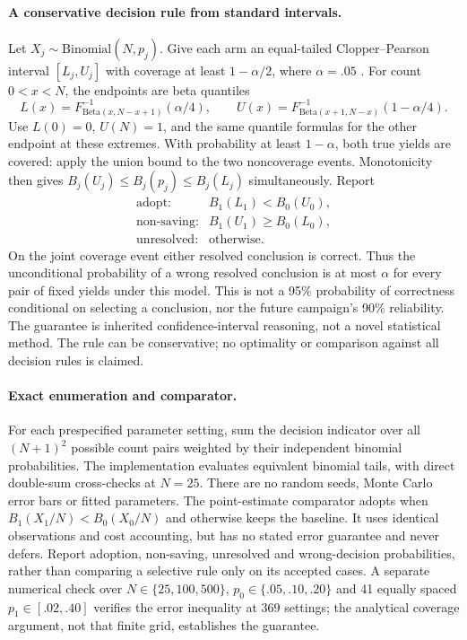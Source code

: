 \paragraph{A conservative decision rule from standard intervals.}
Let $X_j\sim\mathrm{Binomial}(N,p_j)$. Give each arm an equal-tailed Clopper--Pearson interval $[L_j,U_j]$ with coverage at least $1-\alpha/2$, where $\alpha=.05$ \citep{clopper1934}. For count $0<x<N$, the endpoints are beta quantiles
\[
 L(x)=F^{-1}_{\mathrm{Beta}(x,N-x+1)}(\alpha/4),\qquad
 U(x)=F^{-1}_{\mathrm{Beta}(x+1,N-x)}(1-\alpha/4).
\]
Use $L(0)=0$, $U(N)=1$, and the same quantile formulas for the other endpoint at these extremes. With probability at least $1-\alpha$, both true yields are covered: apply the union bound to the two noncoverage events. Monotonicity then gives $B_j(U_j)\le B_j(p_j)\le B_j(L_j)$ simultaneously. Report
\[
 \begin{array}{ll}
 \text{adopt:} & B_1(L_1)<B_0(U_0),\\
 \text{non-saving:} & B_1(U_1)\ge B_0(L_0),\\
 \text{unresolved:} & \text{otherwise}.
 \end{array}
\]
On the joint coverage event either resolved conclusion is correct. Thus the unconditional probability of a wrong resolved conclusion is at most $\alpha$ for every pair of fixed yields under this model. This is not a 95\% probability of correctness conditional on selecting a conclusion, nor the future campaign's 90\% reliability. The guarantee is inherited confidence-interval reasoning, not a novel statistical method. The rule can be conservative; no optimality or comparison against all decision rules is claimed.

\paragraph{Exact enumeration and comparator.}
For each prespecified parameter setting, sum the decision indicator over all $(N+1)^2$ possible count pairs weighted by their independent binomial probabilities. The implementation evaluates equivalent binomial tails, with direct double-sum cross-checks at $N=25$. There are no random seeds, Monte Carlo error bars or fitted parameters. The point-estimate comparator adopts when $B_1(X_1/N)<B_0(X_0/N)$ and otherwise keeps the baseline. It uses identical observations and cost accounting, but has no stated error guarantee and never defers. Report adoption, non-saving, unresolved and wrong-decision probabilities, rather than comparing a selective rule only on its accepted cases. A separate numerical check over $N\in\{25,100,500\}$, $p_0\in\{.05,.10,.20\}$ and 41 equally spaced $p_1\in[.02,.40]$ verifies the error inequality at 369 settings; the analytical coverage argument, not that finite grid, establishes the guarantee.

